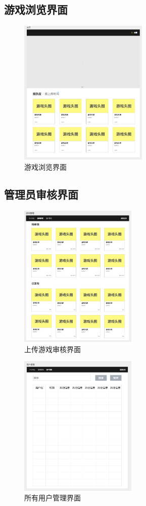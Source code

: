 \documentclass[12pt]{ctexart} %
\begin{document}
\subsection{游戏浏览界面}

\begin{figure}[H]
  \centering
  \includegraphics[width=0.55\textwidth]{main.jpg}
  \caption{游戏浏览界面}
\end{figure}

\subsection{管理员审核界面}

\begin{figure}[H]
  \centering
  \includegraphics[width=0.5\textwidth]{admin_game.jpg}
  \caption{上传游戏审核界面}
\end{figure}

\begin{figure}[H]
  \centering
  \includegraphics[width=0.5\textwidth]{admin_user.jpg}
  \caption{所有用户管理界面}
\end{figure}
\end{document}
